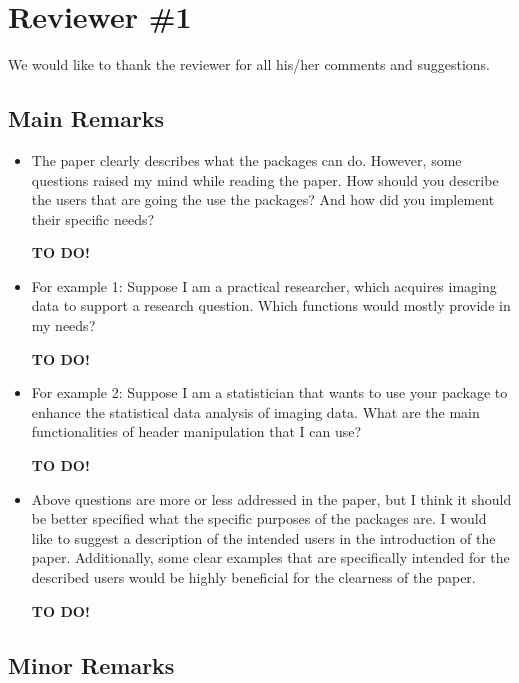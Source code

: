 \documentclass[11pt]{article}
\begin{document}
\section*{Reviewer \#1}

We would like to thank the reviewer for all his/her comments and
suggestions.

\subsection*{Main Remarks}

\begin{itemize}

\item The paper clearly describes what the packages can do. However,
  some questions raised my mind while reading the paper. How should
  you describe the users that are going the use the packages? And how
  did you implement their specific needs?  

  \textbf{TO DO!}

\item For example 1: Suppose I am a practical researcher, which
  acquires imaging data to support a research question.  Which
  functions would mostly provide in my needs?

  \textbf{TO DO!}

\item For example 2: Suppose I am a statistician that wants to use
  your package to enhance the statistical data analysis of imaging
  data.  What are the main functionalities of header manipulation that
  I can use?

  \textbf{TO DO!}

\item Above questions are more or less addressed in the paper, but I
  think it should be better specified what the specific purposes of
  the packages are.  I would like to suggest a description of the
  intended users in the introduction of the paper.  Additionally, some
  clear examples that are specifically intended for the described
  users would be highly beneficial for the clearness of the paper.

  \textbf{TO DO!}

\end{itemize}

\subsection*{Minor Remarks}
\end{document}
